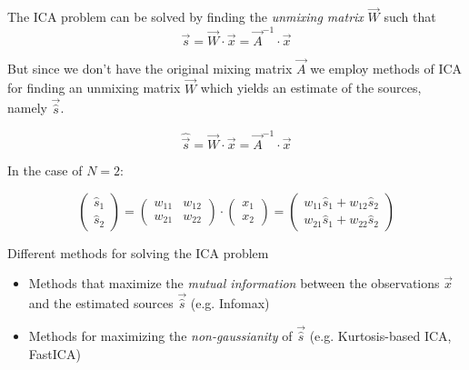 \begin{frame}{\secname}

The ICA problem can be solved by finding the \emph{unmixing matrix} $\vec W$ such that 
\begin{equation}
\vec s = \vec W \cdot \vec x = \vec A^{-1} \cdot \vec x
\end{equation}

But since we don't have the original mixing matrix $\vec A$ we employ methods of ICA for finding an unmixing matrix $\vec W$ which yields an estimate of the sources, namely $\vec {\hat s}$. 

\begin{equation}
\hat{\vec s} = \vec W \cdot \vec x = \vec A^{-1} \cdot \vec x
\end{equation}

In the case of $N=2$:

\begin{equation}
 \left( \begin{array}{ll}
			\hat s_1 \\ \hat s_2
		\end{array} \right)
        = \left( \begin{array}{ll}
			w_{11} & w_{12} \\ w_{21} & w_{22}
		\end{array} \right) \cdot \left( \begin{array}{ll}
			x_1 \\ x_2
		\end{array} \right)
	= \left( \begin{array}{l}
		w_{11} \hat s_1 + w_{12} \hat s_2 \\ w_{21} \hat s_1 + w_{22} \hat s_2
	\end{array} \right)
\end{equation}

\end{frame}

\begin{frame}{Different methods for solving the ICA problem}


\begin{itemize}
\item Methods that maximize the \emph{mutual information} between the observations $\vec x$ and the estimated sources $\vec {\hat s}$ (e.g. Infomax)
\item Methods for maximizing the \emph{non-gaussianity} of $\vec {\hat s}$ (e.g. Kurtosis-based ICA, FastICA)
\end{itemize}

\end{frame}

